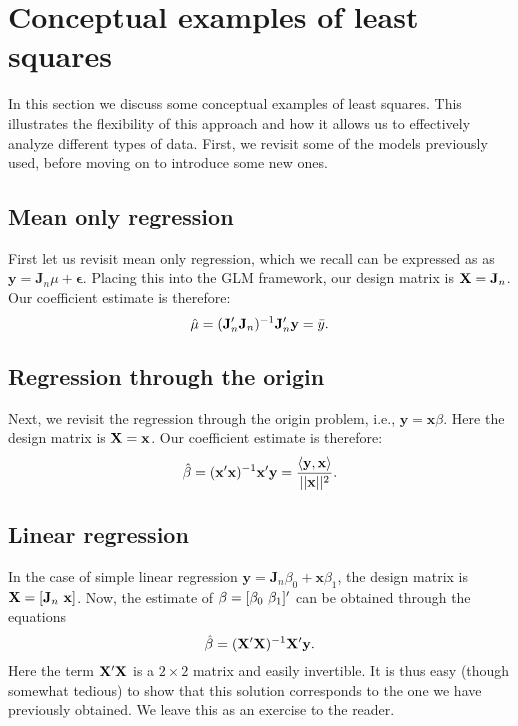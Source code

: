 \section{Conceptual examples of least squares}

In this section we discuss some conceptual examples of least squares. This illustrates the flexibility of this approach and how it allows us to effectively analyze different types of data. First, we revisit some of the models previously used, before moving on to introduce some new ones.


\subsection{Mean only regression}
First let us revisit mean only regression,  which we recall can be expressed as as ${\mathbf y} = {\mathbf J}_n \mu + {\mathbf \epsilon}$.
Placing this into the GLM framework, our design matrix is $\mathbf{X} = {\bf J}_n$. Our coefficient estimate is therefore:
$$
{\hat \mu}=({\bf J}_n'{\bf J}_n)^{-1} {\bf J}_n' \mathbf{y} = \bar y.
$$

\subsection{Regression through the origin}

Next, we revisit the regression through the origin problem, i.e., ${\mathbf y} = {\mathbf x} \beta$. 
Here the design matrix is $\mathbf{X} = \mathbf{x}$. Our coefficient estimate is therefore:
$$
{\hat \beta} = (\mathbf{x}'\mathbf{x})^{-1}\mathbf{x}' \mathbf{y}
= \frac{\langle \mathbf{y}, \mathbf{x} \rangle}{||\mathbf{x}||^2}.
$$

\subsection{Linear regression}

In the case of simple linear regression ${\mathbf y} = {\mathbf J}_n \beta_0 + {\mathbf x} \beta_1$, the design matrix is $\mathbf{X} = [ {\bf J}_n \, \, \mathbf{x} ]$. Now, the estimate of ${\bf \beta} = [ \beta_0 \, \, \beta_1]'$ can be obtained through the equations 
$$
{\hat \beta} = (\mathbf{X}' \mathbf{X})^{-1} \mathbf{X}' \mathbf{y}.
$$
Here the term $\mathbf{X}' \mathbf{X}$ is a $2 \times 2$ matrix and easily invertible. It is thus easy (though somewhat tedious) to show that this solution corresponds to the one we have previously obtained. We leave this as an exercise to the reader.


